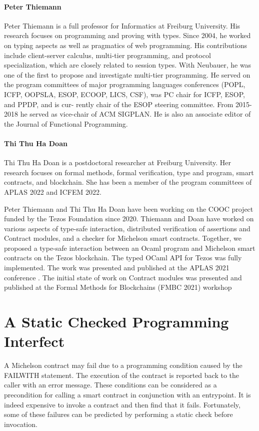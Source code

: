 \documentclass[a4paper,11pt]{article}
\begin{document}
\paragraph{Peter Thiemann}
Peter Thiemann is a full professor for Informatics at Freiburg University.
His research focuses on programming and proving with types. Since 2004, he worked on
typing aspects as well as pragmatics of web programming. His contributions include client-server calculus, multi-tier programming, and protocol specialization, which are closely related to session types. With Neubauer, he was one of the first to propose and investigate multi-tier
programming. He served on the program committees of major programming languages conferences (POPL,
ICFP, OOPSLA, ESOP, ECOOP, LICS, CSF), was PC chair for ICFP, ESOP, and PPDP, and is cur-
rently chair of the ESOP steering committee. From 2015-2018 he served as vice-chair of ACM
SIGPLAN. He is also an associate editor of the Journal of Functional Programming.


\paragraph{Thi Thu Ha Doan} Thi Thu Ha Doan is a postdoctoral researcher at Freiburg University. Her research focuses on formal methods, formal verification, type and program, smart contracts, and blockchain. She has been a member of the program committees of APLAS 2022 and ICFEM 2022. 

Peter Thiemann and Thi Thu Ha Doan have been working on the COOC project funded by the Tezos Foundation since 2020. Thiemann and Doan have worked on various aspects of type-safe interaction, distributed verification of assertions and Contract modules, and a checker for Michelson smart contracts. Together, we proposed a type-safe interaction between an Ocaml program and Michelson smart contracts on the Tezos blockchain. The typed OCaml API for Tezos was fully implemented. The work was presented and published at the APLAS 2021 conference \cite{DBLP:conf/fc/ThiemannAplas21}. The initial state of work on Contract modules was presented and published at the Formal Methods for Blockchains (FMBC 2021) workshop \cite{DBLP:conf/fc/ThiemannFmbc21}


\section{A Static Checked Programming Interfect}
\label{sec:checked-programming-interfect}
A Michelson contract may fail due to a programming condition caused by the FAILWITH statement. The execution of the contract is reported back to the caller with an error message. These conditions can be considered as a precondition for calling a smart contract in conjunction with an entrypoint. It is indeed expensive to invoke a contract and then find that it fails. Fortunately, some of these failures can be predicted by performing a static check before invocation.
\end{document}
